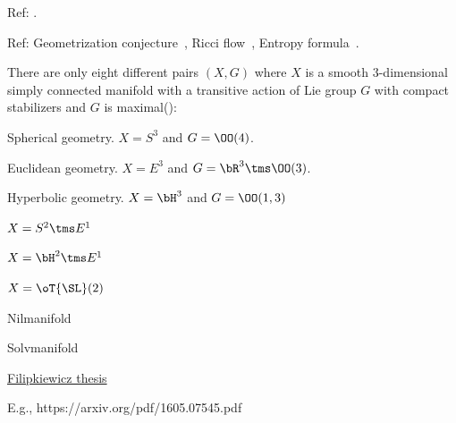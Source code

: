 \documentclass[0-main]{subfiles}
\begin{document}
\ifSubfilesClassLoaded{
	\tableofcontents
}{}

Ref: \cite{MF2010,Taubes2015}.


Ref: Geometrization conjecture~\cite{Thurston1982}, Ricci flow~\cite{Hamilton1982}, Entropy formula~\cite{Perelman2002}.


There are only eight different pairs $(X,G)$ where $X$ is a smooth $3$-dimensional simply connected manifold with a transitive action of Lie group $G$ with compact stabilizers and $G$ is maximal(\cite[Section~4]{Thurston1982}):

\begin{enr}
	\item Spherical geometry. $X=S^{3}$ and $G=\OO(4)$.
	\item Euclidean geometry. $X=E^{3}$ and $G=\bR^{3}\tms\OO(3)$.
	\item Hyperbolic geometry. $X=\bH^{3}$ and $G=\OO(1,3)$
	\item $X=S^{2}\tms E^{1}$
	\item $X=\bH^{2}\tms E^{1}$
	\item $X=\oT{\SL}(2)$
	\item Nilmanifold
	\item Solvmanifold
\end{enr}


\href{http://wrap.warwick.ac.uk/954/}{Filipkiewicz thesis}



E.g., https://arxiv.org/pdf/1605.07545.pdf

\ifSubfilesClassLoaded{
	
	
}{}
\end{document}
